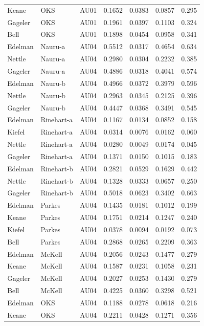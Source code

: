 \documentclass{monashthesis}
\begin{document}
\begin{center}
\begin{longtable}{lllllll}
Keane & OKS & AU01 & 0.1652 & 0.0383 & 0.0857 & 0.295 \\
Gageler & OKS & AU01 & 0.1961 & 0.0397 & 0.1103 & 0.324 \\
Bell & OKS & AU01 & 0.1898 & 0.0454 & 0.0958 & 0.341 \\
Edelman & Nauru-a & AU04 & 0.5512 & 0.0317 & 0.4654 & 0.634 \\
Nettle & Nauru-a & AU04 & 0.2980 & 0.0304 & 0.2232 & 0.385 \\
Gageler & Nauru-a & AU04 & 0.4886 & 0.0318 & 0.4041 & 0.574 \\
Edelman & Nauru-b & AU04 & 0.4966 & 0.0372 & 0.3979 & 0.596 \\
Nettle & Nauru-b & AU04 & 0.2963 & 0.0345 & 0.2125 & 0.396 \\
Gageler & Nauru-b & AU04 & 0.4447 & 0.0368 & 0.3491 & 0.545 \\
Edelman & Rinehart-a & AU04 & 0.1167 & 0.0134 & 0.0852 & 0.158 \\
Kiefel & Rinehart-a & AU04 & 0.0314 & 0.0076 & 0.0162 & 0.060 \\
Nettle & Rinehart-a & AU04 & 0.0280 & 0.0049 & 0.0174 & 0.045 \\
Gageler & Rinehart-a & AU04 & 0.1371 & 0.0150 & 0.1015 & 0.183 \\
Edelman & Rinehart-b & AU04 & 0.2821 & 0.0529 & 0.1629 & 0.442 \\
Nettle & Rinehart-b & AU04 & 0.1328 & 0.0333 & 0.0657 & 0.250 \\
Gageler & Rinehart-b & AU04 & 0.5018 & 0.0623 & 0.3402 & 0.663 \\
Edelman & Parkes & AU04 & 0.1435 & 0.0181 & 0.1012 & 0.199 \\
Keane & Parkes & AU04 & 0.1751 & 0.0214 & 0.1247 & 0.240 \\
Kiefel & Parkes & AU04 & 0.0378 & 0.0094 & 0.0192 & 0.073 \\
Bell & Parkes & AU04 & 0.2868 & 0.0265 & 0.2209 & 0.363 \\
Edelman & McKell & AU04 & 0.2056 & 0.0243 & 0.1477 & 0.279 \\
Keane & McKell & AU04 & 0.1587 & 0.0231 & 0.1058 & 0.231 \\
Gageler & McKell & AU04 & 0.2027 & 0.0253 & 0.1430 & 0.279 \\
Bell & McKell & AU04 & 0.4225 & 0.0360 & 0.3298 & 0.521 \\
Edelman & OKS & AU04 & 0.1188 & 0.0278 & 0.0618 & 0.216 \\
Keane & OKS & AU04 & 0.2211 & 0.0428 & 0.1271 & 0.356 \\

\end{longtable}
\end{center}
\end{document}
